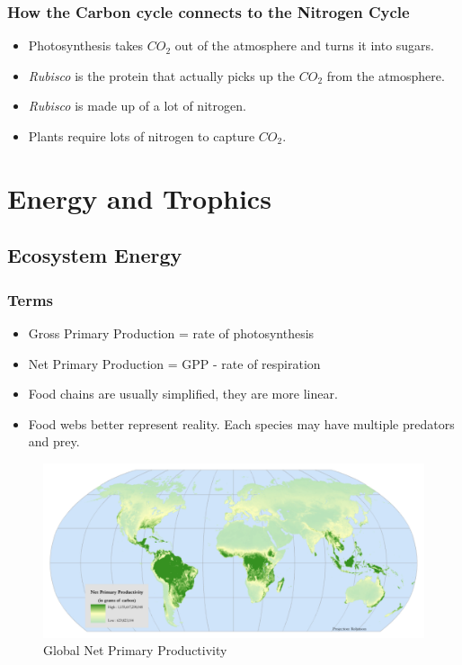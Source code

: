 \documentclass[12pt]{article}
\begin{document}
\subsubsection{How the Carbon cycle connects to the Nitrogen Cycle}

\begin{itemize}
    \item Photosynthesis takes $CO_2$ out of the atmosphere and turns it into sugars.
    \item \textit{Rubisco} is the protein that actually picks up the $CO_2$ from the atmosphere.
    \item \textit{Rubisco} is made up of a lot of nitrogen.
    \item Plants require lots of nitrogen to capture $CO_2$.
\end{itemize}


\section{Energy and Trophics}

\subsection{Ecosystem Energy}

\subsubsection{Terms}
\begin{itemize}
    \item Gross Primary Production = rate of photosynthesis
    \item Net Primary Production = GPP - rate of respiration
    \item Food chains are usually simplified, they are more linear.
    \item Food webs better represent reality. Each species may have multiple predators and prey.
\end{itemize}

\begin{figure}[tph]
    \centering
    \includegraphics[width=5in]{npp-map.png}
    \caption{Global Net Primary Productivity} \label{npp-map}
\end{figure}
\end{document}
